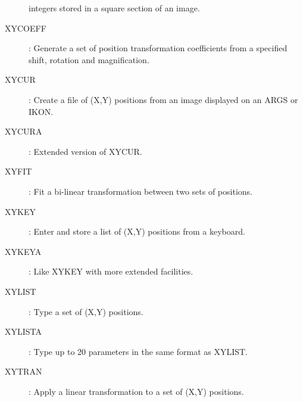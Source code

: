 \begin{description}
integers stored in a square section of an image.
\item [XYCOEFF]: Generate a set of position transformation coefficients from a
specified shift, rotation and magnification.
\item [XYCUR]: Create a file of (X,Y) positions from an image displayed
on an ARGS or IKON.
\item [XYCURA]: Extended version of XYCUR.
\item [XYFIT]: Fit a bi-linear transformation between two sets of positions.
\item [XYKEY]: Enter and store a list of (X,Y) positions from a keyboard.
\item [XYKEYA]: Like XYKEY with more extended facilities.
\item [XYLIST]: Type a set of (X,Y) positions.
\item [XYLISTA]: Type up to 20 parameters in the same format as XYLIST.
\item [XYTRAN]: Apply a linear transformation to a set of (X,Y) positions.
\end{description}
